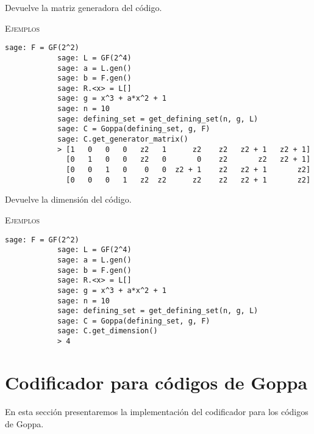 \begin{description}[leftmargin=1em, font=\normalfont\ttfamily, style=nextline]
\begin{description}[font=\ttfamily, style=nextline]
        \item[get\_generator\_matrix(self)] Devuelve la matriz generadora del código.

        \textsc{Ejemplos}
        \begin{lstlisting}[gobble=4]
            sage: F = GF(2^2)
            sage: L = GF(2^4)
            sage: a = L.gen()
            sage: b = F.gen()
            sage: R.<x> = L[]
            sage: g = x^3 + a*x^2 + 1
            sage: n = 10
            sage: defining_set = get_defining_set(n, g, L)
            sage: C = Goppa(defining_set, g, F)
            sage: C.get_generator_matrix()
            > [1   0   0   0   z2   1      z2    z2   z2 + 1   z2 + 1]
              [0   1   0   0   z2   0       0    z2       z2   z2 + 1]
              [0   0   1   0    0   0  z2 + 1    z2   z2 + 1       z2]
              [0   0   0   1   z2  z2      z2    z2   z2 + 1       z2]
        \end{lstlisting}

        \item[get\_dimension(self)] Devuelve la dimensión del código.

        \textsc{Ejemplos}
        \begin{lstlisting}[gobble=4]
            sage: F = GF(2^2)
            sage: L = GF(2^4)
            sage: a = L.gen()
            sage: b = F.gen()
            sage: R.<x> = L[]
            sage: g = x^3 + a*x^2 + 1
            sage: n = 10
            sage: defining_set = get_defining_set(n, g, L)
            sage: C = Goppa(defining_set, g, F)
            sage: C.get_dimension()
            > 4
        \end{lstlisting}
    \end{description}
\end{description}

\section{Codificador para códigos de Goppa}

En esta sección presentaremos la implementación del codificador para los códigos de Goppa.

